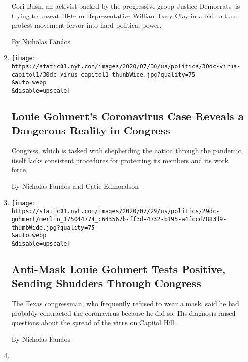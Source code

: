\begin{enumerate}
  Cori Bush, an activist backed by the progressive group Justice
  Democrats, is trying to unseat 10-term Representative William Lacy
  Clay in a bid to turn protest-movement fervor into hard political
  power.

  By Nicholas Fandos
\item
  \href{/2020/07/30/us/politics/gohmert-coronavirus-congress.html}{}

  \texttt{[image: https://static01.nyt.com/images/2020/07/30/us/politics/30dc-virus-capitol1/30dc-virus-capitol1-thumbWide.jpg?quality=75\\\&auto=webp\\\&disable=upscale]}

  \hypertarget{louie-gohmerts-coronavirus-case-reveals-a-dangerous-reality-in-congress}{%
  \subsection{Louie Gohmert's Coronavirus Case Reveals a Dangerous
  Reality in
  Congress}\label{louie-gohmerts-coronavirus-case-reveals-a-dangerous-reality-in-congress}}

  Congress, which is tasked with shepherding the nation through the
  pandemic, itself lacks consistent procedures for protecting its
  members and its work force.

  By Nicholas Fandos and Catie Edmondson
\item
  \href{/2020/07/29/us/politics/louie-gohmert-positive-coronavirus-mask.html}{}

  \texttt{[image: https://static01.nyt.com/images/2020/07/29/us/politics/29dc-gohmert/merlin\_175044774\_c643567b-ff3d-4732-b195-a4fccd7883d9-thumbWide.jpg?quality=75\\\&auto=webp\\\&disable=upscale]}

  \hypertarget{anti-mask-louie-gohmert-tests-positive-sending-shudders-through-congress}{%
  \subsection{Anti-Mask Louie Gohmert Tests Positive, Sending Shudders
  Through
  Congress}\label{anti-mask-louie-gohmert-tests-positive-sending-shudders-through-congress}}

  The Texas congressman, who frequently refused to wear a mask, said he
  had probably contracted the coronavirus because he did so. His
  diagnosis raised questions about the spread of the virus on Capitol
  Hill.

  By Nicholas Fandos
\item
  \href{/2020/07/28/us/politics/barr-testimony.html}{}


\end{enumerate}
